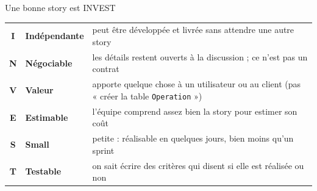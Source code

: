 \documentclass[aspectratio=169,10pt]{beamer}
\begin{document}
\begin{frame}{Une bonne story est INVEST}
  \begin{datacard}
    \small
    \begin{tabular}{@{}cl p{9.4cm}@{}}
      \textbf{\color{qaaccent}\Large I} & \textbf{Indépendante} & peut être développée et livrée sans attendre une autre story \\[0.5mm]
      \textbf{\color{qaaccent}\Large N} & \textbf{Négociable} & les détails restent ouverts à la discussion ; ce n'est pas un contrat \\[0.5mm]
      \textbf{\color{qaaccent}\Large V} & \textbf{Valeur} & apporte quelque chose à un utilisateur ou au client (pas « créer la table \texttt{Operation} ») \\[0.5mm]
      \textbf{\color{qaaccent}\Large E} & \textbf{Estimable} & l'équipe comprend assez bien la story pour estimer son coût \\[0.5mm]
      \textbf{\color{qaaccent}\Large S} & \textbf{Small} & petite : réalisable en quelques jours, bien moins qu'un sprint \\[0.5mm]
      \textbf{\color{qaaccent}\Large T} & \textbf{Testable} & on sait écrire des critères qui disent si elle est réalisée ou non \\
    \end{tabular}
  \end{datacard}
  \vspace{1mm}
\end{frame}
\end{document}
